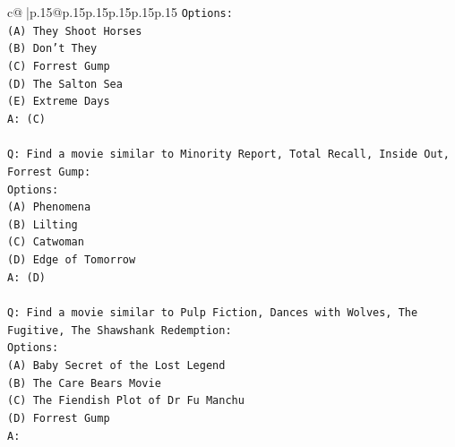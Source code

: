 \documentclass{article}
\begin{document}
{\begin{supertabular}{c@{$\;$}|p{.15\linewidth}@{}p{.15\linewidth}p{.15\linewidth}p{.15\linewidth}p{.15\linewidth}p{.15\linewidth}}
{{{\texttt{Options:} \\
\texttt{(A) They Shoot Horses} \\
\texttt{(B) Don't They} \\
\texttt{(C) Forrest Gump} \\
\texttt{(D) The Salton Sea} \\
\texttt{(E) Extreme Days} \\
\texttt{A: (C)} \\
\\ 
\texttt{Q: Find a movie similar to Minority Report, Total Recall, Inside Out, Forrest Gump:} \\
\texttt{Options:} \\
\texttt{(A) Phenomena} \\
\texttt{(B) Lilting} \\
\texttt{(C) Catwoman} \\
\texttt{(D) Edge of Tomorrow} \\
\texttt{A: (D)} \\
\\ 
\texttt{Q: Find a movie similar to Pulp Fiction, Dances with Wolves, The Fugitive, The Shawshank Redemption:} \\
\texttt{Options:} \\
\texttt{(A) Baby Secret of the Lost Legend} \\
\texttt{(B) The Care Bears Movie} \\
\texttt{(C) The Fiendish Plot of Dr Fu Manchu} \\
\texttt{(D) Forrest Gump} \\
\texttt{A:} \\
            }
        }
    }
     \\ \\


\end{supertabular}}
\end{document}
